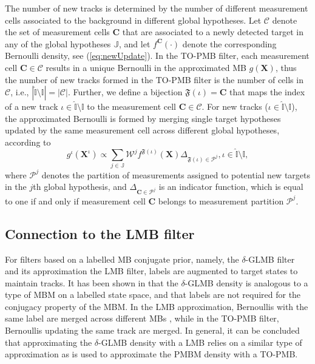 \documentclass[journal]{IEEEtran}
\begin{document}
The number of new tracks is determined by the number of different measurement cells associated to the background in different global hypotheses. Let $\mathcal{C}$ denote the set of measurement cells $\mathbf{C}$ that are associated to a newly detected target in any of the global hypotheses $\mathbb{J}$, and let $f^{\mathbf{C}}(\cdot)$ denote the corresponding Bernoulli density, see (\ref{eq:newUpdate}). In the TO-PMB filter, each measurement cell $\mathbf{C}\in\mathcal{C}$ results in a unique Bernoulli in the approximated MB $g(\mathbf{X})$, thus the number of new tracks formed in the TO-PMB filter is the number of cells in $\mathcal{C}$, i.e., $|\hat{\mathbb{I}}\setminus\mathbb{I}|=|\mathcal{C}|$. 
Further, we define a bijection $\mathfrak{F}(\iota)=\mathbf{C}$ that maps the index of a new track $\iota\in\hat{\mathbb{I}}\setminus\mathbb{I}$ to the measurement cell $\mathbf{C}\in\mathcal{C}$. For new tracks ($\iota\in\hat{\mathbb{I}}\setminus\mathbb{I}$), the approximated Bernoulli is formed by merging single target hypotheses updated by the same measurement cell across different global hypotheses, according to
\begin{equation}
    g^{\iota}(\mathbf{X}^{\iota}) \propto \sum_{j\in\mathbb{J}}\mathcal{W}^jf^{\mathfrak{F}(\iota)}(\mathbf{X})\Delta_{\mathfrak{F}(\iota)\in\mathcal{P}^j}, \iota\in\hat{\mathbb{I}}\setminus\mathbb{I},
    \label{eq:tonew}
\end{equation}
where $\mathcal{P}^j$ denotes the partition of measurements assigned to potential new targets in the $j$th global hypothesis, and $\Delta_{\mathbf{C}\in\mathcal{P}^j}$ is an indicator function, which is equal to one if and only if measurement cell $\mathbf{C}$ belongs to measurement partition $\mathcal{P}^j$.

\subsection{Connection to the LMB filter}
For filters based on a labelled MB conjugate prior, namely, the $\delta$-GLMB filter and its approximation the LMB filter, labels are augmented to target states to maintain tracks. It has been shown in \cite{pmbmpoint2} that the $\delta$-GLMB density is analogous to a type of MBM on a labelled state space, and that labels are not required for the conjugacy property of the MBM. In the LMB approximation, Bernoullis with the same label are merged across different MBs \cite{lmb}, while in the TO-PMB filter, Bernoullis updating the same track are merged. In general, it can be concluded that approximating the $\delta$-GLMB density with a LMB relies on a similar type of approximation as is used to approximate the PMBM density with a TO-PMB. 
\end{document}
